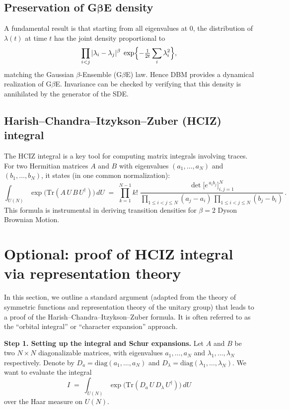 \documentclass[letterpaper,11pt,oneside,reqno]{article}
\numberwithin{equation}{section}
\theoremstyle{definition}
\begin{document}
\subsection{Preservation of G\(\boldsymbol{\beta}\)E density}
A fundamental result is that starting from all eigenvalues at \(0\),
the distribution of \(\lambda(t)\) at time \(t\) has the joint density
proportional to
\[
\prod_{i<j}|\lambda_i - \lambda_j|^\beta\;
\exp\Bigl\{-\tfrac{1}{2t}\sum_i \lambda_i^2\Bigr\},
\]
matching the Gaussian \(\beta\)-Ensemble (G\(\beta\)E) law.  Hence DBM provides
a dynamical realization of G\(\beta\)E.  Invariance can be checked by verifying
that this density is annihilated by the generator of the SDE.

\subsection{Harish--Chandra--Itzykson--Zuber (HCIZ) integral}
The HCIZ integral is a key tool for computing matrix integrals involving traces.
For two Hermitian matrices \(A\) and \(B\) with eigenvalues
\((a_1,\dots,a_N)\) and \((b_1,\dots,b_N)\), it states (in one common
normalization):
\[
\int_{U(N)} \exp\bigl(\mathrm{Tr}(A\,U\,B\,U^\dagger)\bigr)\,dU
\;=\;
\prod_{k=1}^{N-1} k!\;
\frac{\det\bigl[e^{\,a_i b_j}\bigr]_{i,j=1}^N}{
\prod_{1\le i<j\le N}(a_j-a_i)\,\prod_{1\le i<j\le N}(b_j-b_i)}\,.
\]
This formula is instrumental in deriving transition densities for
\(\beta=2\) Dyson Brownian Motion.

\section{Optional: proof of HCIZ integral via representation theory}


In this section, we outline a standard argument (adapted from the theory of symmetric functions and representation theory of the unitary group) that leads to a proof of the Harish--Chandra--Itzykson--Zuber formula.  It is often referred to as the ``orbital integral'' or ``character expansion'' approach.

\smallskip

\noindent
\textbf{Step 1. Setting up the integral and Schur expansions.}
Let \(A\) and \(B\) be two \(N\times N\) diagonalizable matrices, with eigenvalues \(a_1,\ldots,a_N\) and \(\lambda_1,\ldots,\lambda_N\) respectively.  Denote by \(D_a = \mathrm{diag}(a_1,\ldots,a_N)\) and \(D_\lambda = \mathrm{diag}(\lambda_1,\ldots,\lambda_N)\).  We want to evaluate the integral
\[
I \;=\; \int_{U(N)} \exp\bigl(\mathrm{Tr}(D_a\,U\,D_\lambda\,U^\dagger)\bigr)\,dU
\]
over the Haar measure on \(U(N)\).
\end{document}

